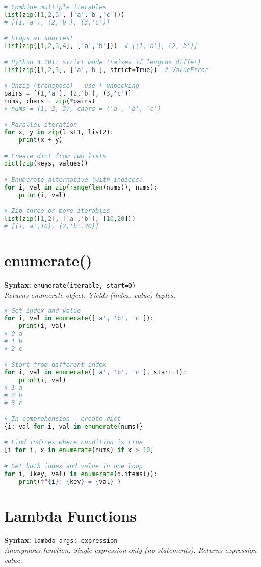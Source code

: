 \documentclass[8pt,landscape]{article}
\begin{document}
\begin{multicols}{3}
\begin{lstlisting}[language=Python]
# Combine multiple iterables
list(zip([1,2,3], ['a','b','c']))
# [(1,'a'), (2,'b'), (3,'c')]

# Stops at shortest
list(zip([1,2,3,4], ['a','b']))  # [(1,'a'), (2,'b')]

# Python 3.10+: strict mode (raises if lengths differ)
list(zip([1,2,3], ['a','b'], strict=True))  # ValueError

# Unzip (transpose) - use * unpacking
pairs = [(1,'a'), (2,'b'), (3,'c')]
nums, chars = zip(*pairs)
# nums = (1, 2, 3), chars = ('a', 'b', 'c')

# Parallel iteration
for x, y in zip(list1, list2):
    print(x + y)

# Create dict from two lists
dict(zip(keys, values))

# Enumerate alternative (with indices)
for i, val in zip(range(len(nums)), nums):
    print(i, val)

# Zip three or more iterables
list(zip([1,2], ['a','b'], [10,20]))
# [(1,'a',10), (2,'b',20)]
\end{lstlisting}

\section*{enumerate()}
\textbf{Syntax:} \lstinline|enumerate(iterable, start=0)| \\
\textit{Returns enumerate object. Yields (index, value) tuples.}

\begin{lstlisting}[language=Python]
# Get index and value
for i, val in enumerate(['a', 'b', 'c']):
    print(i, val)
# 0 a
# 1 b
# 2 c

# Start from different index
for i, val in enumerate(['a', 'b', 'c'], start=1):
    print(i, val)
# 1 a
# 2 b
# 3 c

# In comprehension - create dict
{i: val for i, val in enumerate(nums)}

# Find indices where condition is true
[i for i, x in enumerate(nums) if x > 10]

# Get both index and value in one loop
for i, (key, val) in enumerate(d.items()):
    print(f"{i}: {key} = {val}")
\end{lstlisting}

\section*{Lambda Functions}
\textbf{Syntax:} \lstinline|lambda args: expression| \\
\textit{Anonymous function. Single expression only (no statements). Returns expression value.}


\end{multicols}
\end{document}
